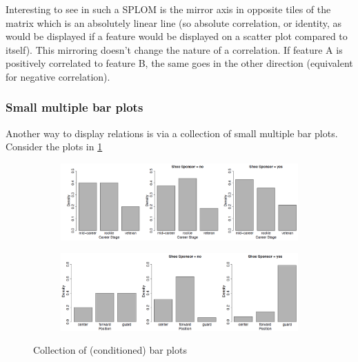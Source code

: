 Interesting to see in such a SPLOM is the mirror axis in opposite tiles of the matrix which is an absolutely linear line (so absolute correlation, or identity, as would be displayed if a feature would be displayed on a scatter plot compared to itself). This mirroring doesn't change the nature of a correlation. If feature A is positively correlated to feature B, the same goes in the other direction (equivalent for negative correlation).

\subsubsection*{Small multiple bar plots}

Another way to display relations is via a collection of small multiple bar plots. Consider the plots in \ref{fig:2_barplot}

\begin{figure}[H]
  \centering
  \begin{subfigure}{0.8\textwidth}
    \centering
    \includegraphics[width=\textwidth]{assets/visualization_and_extraction/feature_relation/bar_no.png}
  \end{subfigure}
  
  \vspace*{0.2cm}

  \begin{subfigure}{0.75\textwidth}
    \centering
    \includegraphics[width=\textwidth]{assets/visualization_and_extraction/feature_relation/bar_strong.png}
  \end{subfigure}
  \caption{Collection of (conditioned) bar plots}
  \label{fig:2_barplot}
\end{figure}